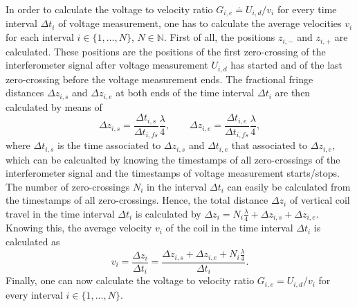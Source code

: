 \documentclass{report}
\numberwithin{tm}{section}
\begin{document}
In order to calculate the voltage to velocity ratio $G_{i,e} \doteq U_{i,d}/v_i$ for every time interval $\Delta t_i$ of voltage measurement, one has to calculate the average velocities $v_i$ for each interval $i \in \{1,\dots,N\}$, $N \in \mathbb{N}$. First of all, the positions $z_{i,-}$ and $z_{i, +}$ are calculated. These positions are the positions of the first zero-crossing of the interferometer signal after voltage measurement $U_{i,d}$ has started and of the last zero-crossing before the voltage measurement ends. The fractional fringe distances $\Delta z_{i,s}$ and $\Delta z_{i,e}$ at both ends of the time interval $\Delta t_i$ are then calculated by means of \begin{equation}
	\Delta z_{i,s} = \frac{\Delta t_{i,s}}{\Delta t_{i,fs}}\frac{\lambda}{4}, \qquad \Delta z_{i,e} = \frac{\Delta t_{i,e}}{\Delta t_{i,fs}}\frac{\lambda}{4},
\end{equation} where $\Delta t_{i,s}$ is the time associated to $\Delta z_{i,s}$ and $\Delta t_{i,e}$ that associated to $\Delta z_{i,e}$, which can be calcualted by knowing the timestamps of all zero-crossings of the interferometer signal and the timestamps of voltage measurement starts/stops. The number of zero-crossings $N_i$ in the interval $\Delta t_i$ can easily be calculated from the timestamps of all zero-crossings. Hence, the total distance $\Delta z_i$ of vertical coil travel in the time interval $\Delta t_i$ is calculated by $\Delta z_i = N_i\frac{\lambda}{4} + \Delta z_{i,s} + \Delta z_{i,e}$. Knowing this, the average velocity $v_i$ of the coil in the time interval $\Delta t_i$ is calculated as \begin{equation}
v_i = \frac{\Delta z_{i}}{\Delta t_i} = \frac{\Delta z_{i,s} + \Delta z_{i,e} + N_i \tfrac{\lambda}{4}}{\Delta t_i}.
\end{equation} Finally, one can now calculate the voltage to velocity ratio $G_{i,e}= U_{i,d}/v_i$ for every interval $i \in \{1,\dots,N\}$.
\end{document}
